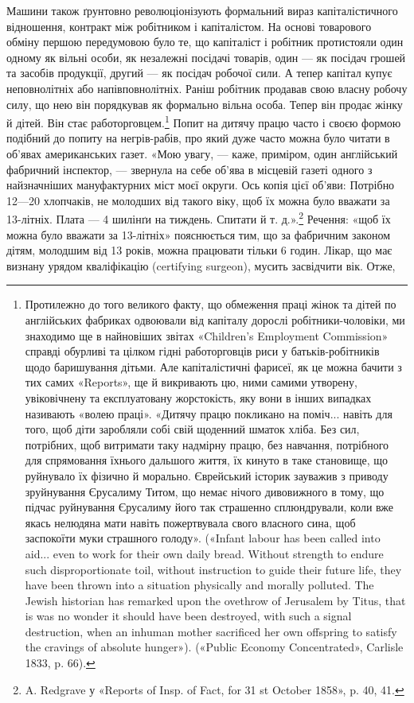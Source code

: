 Машини також ґрунтовно революціонізують формальний вираз
капіталістичного відношення, контракт між робітником і капіталістом.
На основі товарового обміну першою передумовою було
те, що капіталіст і робітник протистояли один одному як вільні
особи, як незалежні посідачі товарів, один — як посідач грошей
та засобів продукції, другий — як посідач робочої сили. А тепер
капітал купує неповнолітніх або напівповнолітніх. Раніш
робітник продавав свою власну робочу силу, що нею він порядкував
як формально вільна особа. Тепер він продає жінку
й дітей. Він стає работорговцем.\footnote{
Протилежно до того великого факту, що обмеження праці жінок
та дітей по англійських фабриках одвоювали від капіталу дорослі робітники-чоловіки,
ми знаходимо ще в найновіших звітах «Children’s Employment
Commission» справді обурливі та цілком гідні работорговців риси
у батьків-робітників щодо баришування дітьми. Але капіталістичні
фарисеї, як це можна бачити з тих самих «Reports», ще й викривають цю,
ними самими утворену, увіковічнену та експлуатовану жорстокість, яку
вони в інших випадках називають «волею праці». «Дитячу працю покликано
на поміч... навіть для того, щоб діти заробляли собі свій щоденний
шматок хліба. Без сил, потрібних, щоб витримати таку надмірну
працю, без навчання, потрібного для спрямовання їхнього дальшого життя,
їх кинуто в таке становище, що руйнувало їх фізично й морально. Єврейський
історик зауважив з приводу зруйнування Єрусалиму Титом, що
немає нічого дивовижного в тому, що підчас руйнування Єрусалиму його
так страшенно сплюндрували, коли вже якась нелюдяна мати навіть пожертвувала
свого власного сина, щоб заспокоїти муки страшного голоду».
(«Infant labour has been called into aid... even to work for their own daily
bread. Without strength to endure such disproportionate toil, without
instruction to guide their future life, they have been thrown into a situation
physically and morally polluted. The Jewish historian has remarked upon
the ovethrow of Jerusalem by Titus, that is was no wonder it should have
been destroyed, with such a signal destruction, when an inhuman mother
sacrificed her own offspring to satisfy the cravings of absolute hunger»).
(«Public Economy Concentrated», Carlisle 1833, p. 66).
} Попит на дитячу працю
часто і своєю формою подібний до попиту на негрів-рабів,
про який дуже часто можна було читати в об’явах американських
газет. «Мою увагу, — каже, приміром, один англійський
фабричний інспектор, — звернула на себе об’ява в місцевій
газеті одного з найзначніших мануфактурних міст моєї округи.
Ось копія цієї об’яви: Потрібно 12—20 хлопчаків, не молодших
від такого віку, щоб їх можна було вважати за 13-літніх.
Плата — 4 шилінґи на тиждень. Спитати й т. д.».\footnote{
A. Redgrave у «Reports of Insp. of Fact, for 31 st October
1858», p. 40, 41.
} Речення:
«щоб їх можна було вважати за 13-літніх» пояснюється тим, що
за фабричним законом дітям, молодшим від 13 років, можна
працювати тільки 6 годин. Лікар, що має визнану урядом кваліфікацію
(certifying surgeon), мусить засвідчити вік. Отже,

